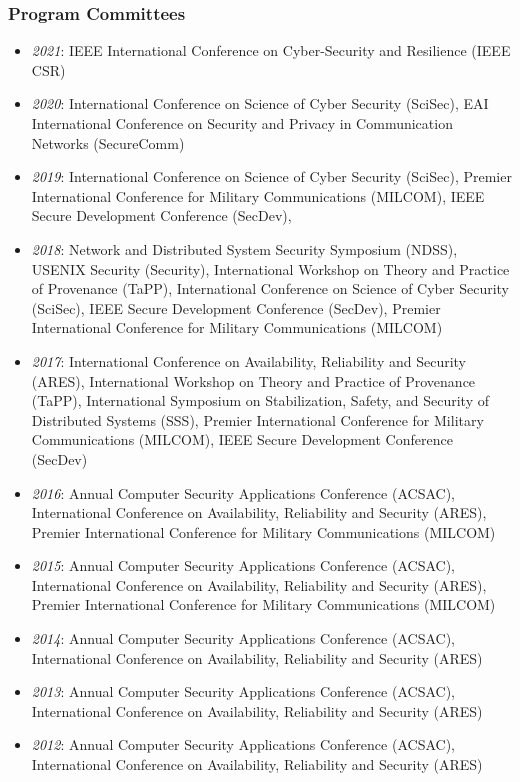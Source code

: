 \hypertarget{program-committees}{%
\subsubsection{Program Committees}\label{program-committees}}
\begin{itemize}
\tightlist
\item
  \emph{2021}: IEEE International Conference on Cyber-Security and Resilience (IEEE CSR)
\item
  \emph{2020}: International Conference on Science of Cyber Security (SciSec), 
  EAI International Conference on Security and Privacy in Communication Networks (SecureComm)
\item
  \emph{2019}: International Conference on Science of Cyber Security (SciSec),
  Premier International Conference for Military Communications (MILCOM),
  IEEE Secure Development Conference (SecDev),
\item
  \emph{2018}: Network and Distributed System Security Symposium (NDSS),
  USENIX Security (Security),
  International Workshop on Theory and Practice of Provenance (TaPP),
  International Conference on Science of Cyber Security (SciSec),
  IEEE Secure Development Conference (SecDev),
  Premier International Conference for Military Communications (MILCOM)
\item
  \emph{2017}: International Conference on Availability, Reliability and Security (ARES),
  International Workshop on Theory and Practice of Provenance (TaPP),
  International Symposium on Stabilization, Safety, and Security of Distributed Systems (SSS),
  Premier International Conference for Military Communications (MILCOM),
  IEEE Secure Development Conference (SecDev)
\item
  \emph{2016}: Annual Computer Security Applications Conference (ACSAC),
  International Conference on Availability, Reliability and Security (ARES),
  Premier International Conference for Military Communications (MILCOM)
\item
  \emph{2015}: Annual Computer Security Applications Conference (ACSAC),
  International Conference on Availability, Reliability and Security (ARES),
  Premier International Conference for Military Communications (MILCOM)
\item
  \emph{2014}: Annual Computer Security Applications Conference (ACSAC),
  International Conference on Availability, Reliability and Security (ARES)
\item
  \emph{2013}: Annual Computer Security Applications Conference (ACSAC),
  International Conference on Availability, Reliability and Security (ARES)
\item
  \emph{2012}: Annual Computer Security Applications Conference (ACSAC),
  International Conference on Availability, Reliability and Security (ARES)
\end{itemize}

